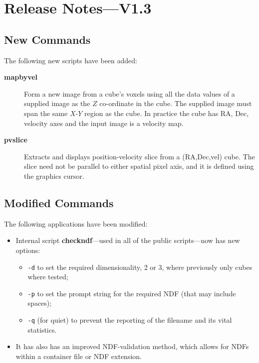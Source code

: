 \documentclass[twoside,11pt]{article}
\newcommand{\htmlref}[2]{#1}
\newcommand{\xlabel}[1]{}
\renewcommand{\_}{\texttt{\symbol{95}}}
\begin{document}
\section{\xlabel{se_changes}Release Notes---V1.3\label{se:changes}}

\subsection{New Commands}
The following new scripts have been added:

\begin{description}
   \item [\htmlref{{\bf mapbyvel}}{mapbyvel}] \mbox{}
     Form a new image from a cube's voxels using all the data
     values of a supplied image as the $Z$ co-ordinate in the cube.
     The supplied image must span the same $X$-$Y$ region as the cube.
     In practice the cube has RA, Dec, velocity axes and the input
     image is a velocity map.

   \item [\htmlref{{\bf pvslice}}{pvslice}] \mbox{}
     Extracts and displays position-velocity slice from a
     (RA,Dec,vel) cube.  The slice need not be parallel to either
     spatial pixel axis, and it is defined using the graphics
     cursor.
\end{description}

\subsection{Modified Commands}
The following applications have been modified:

\begin{itemize}

\item Internal script {\bf checkndf}---used in all of the public
scripts---now has new options:

\begin{itemize}
\item {\tt -d} to set the required dimensionality, 2 or 3, where
previously only cubes where tested;
\item {\tt -p} to set the prompt string for the required NDF (that may
include spaces);
\item {\tt -q} (for quiet) to prevent the reporting of the filename and its
vital statistics.
\end{itemize}

\item It has also has an improved NDF-validation method, which allows for
NDFs within a container file or NDF extension.

\end{itemize}
\end{document}

